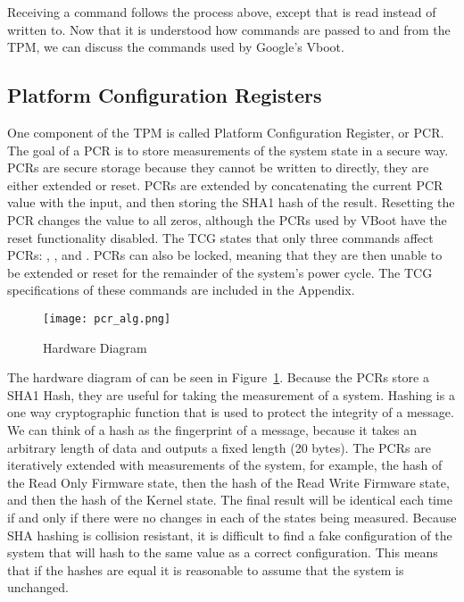 Receiving a command follows the process above, except that  is read instead of written to.
Now that it is understood how commands are passed to and from the TPM, we can discuss the commands used by Google's Vboot.

\subsection{Platform Configuration Registers}

One component of the TPM is called Platform Configuration Register, or PCR.
The goal of a PCR is to store measurements of the system state in a secure way. 
PCRs are secure storage because they cannot be written to directly, they are either extended or reset. 
PCRs are extended by concatenating the current PCR value with the input, and then storing the SHA1 hash of the result. 
Resetting the PCR changes the value to all zeros, although the PCRs used by VBoot have the reset functionality disabled.
The TCG states that only three commands affect PCRs: ,
, and .
PCRs can also be locked, meaning that they are then unable to be extended or reset for the remainder of the system's power cycle.
The TCG specifications of these commands are included in the Appendix.

\begin{figure}
  \centering
  \texttt{[image: pcr\_alg.png]}
  \caption{ Hardware Diagram}
  \label{fig:pcr_alg}
\end{figure}

The hardware diagram of  can be seen in Figure~\ref{fig:pcr_alg}.
Because the PCRs store a SHA1 Hash, they are useful for taking the measurement of a system.  
Hashing is a one way cryptographic function that is used to protect the integrity of a message.
We can think of a hash as the fingerprint of a message, because it takes an arbitrary length of data and outputs a fixed length (20 bytes).
The PCRs are iteratively extended with measurements of the system, for example,
the hash of the Read Only Firmware state, then the hash of the Read Write
Firmware state, and then the hash of the Kernel state.
The final result will be identical each time if and only if there were no changes in each of the states being measured.
Because SHA hashing is collision resistant, it is difficult to find a fake
configuration of the system that will hash to the same value as a correct
configuration.
This means that if the hashes are equal it is reasonable to assume that the system is unchanged. 

